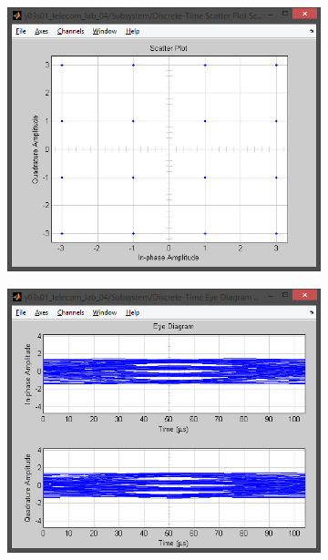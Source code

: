 \documentclass[
	a4paper,
	oneside,
	BCOR = 10mm,
	DIV = 12,
	12pt,
	headings = normal,
]{scrartcl}
\begin{document}
\begin{figure}[!htbp]
\begin{subfigure}{\textwidth / 3}
						\caption{}
						\label{subfig:rolloff-0p4-signal-trajectory-in}
					\end{subfigure}%
					\begin{subfigure}{\textwidth / 3}
						\centering
						\includegraphics[height = 7\baselineskip]{../01-solution/rolloff-0p4-scatter-plot-in.png}
						\caption{}
						\label{subfig:rolloff-0p4-scatter-plot-in}
					\end{subfigure}
					\begin{subfigure}{\textwidth / 3}
						\centering
						\includegraphics[height = 7\baselineskip]{../01-solution/rolloff-0p4-eye-diag-out.png}

\end{subfigure}
\end{figure}
\end{document}
